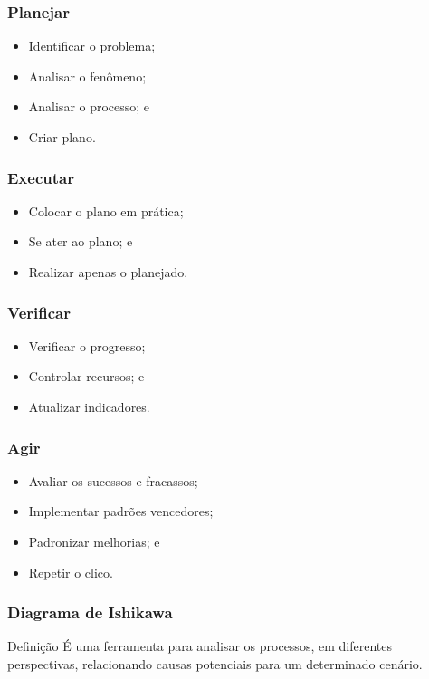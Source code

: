 \documentclass[aspectratio=169]{beamer}
\begin{document}
\begin{frame}
	\frametitle{Planejar}
	
	\begin{itemize}
		\item Identificar o problema;
		\item Analisar o fenômeno;
		\item Analisar o processo; e
		\item Criar plano.
	\end{itemize}
\end{frame}

\begin{frame}
	\frametitle{Executar}

	\begin{itemize}
		\item Colocar o plano em prática;
		\item Se ater ao plano; e
		\item Realizar apenas o planejado.
	\end{itemize}	
\end{frame}

\begin{frame}
	\frametitle{Verificar}

	\begin{itemize}
		\item Verificar o progresso;
		\item Controlar recursos; e
		\item Atualizar indicadores.
	\end{itemize}		
\end{frame}

\begin{frame}
	\frametitle{Agir}

	\begin{itemize}
		\item Avaliar os sucessos e fracassos;
		\item Implementar padrões vencedores;
		\item Padronizar melhorias; e
		\item Repetir o clico.
	\end{itemize}			
\end{frame}

\begin{frame}
	\frametitle{Diagrama de Ishikawa}

	\begin{block}{Defini\c cão}
		 É uma ferramenta para analisar os processos, em diferentes perspectivas, relacionando causas potenciais para um determinado cenário.
	\end{block}
\end{frame}
\end{document}
